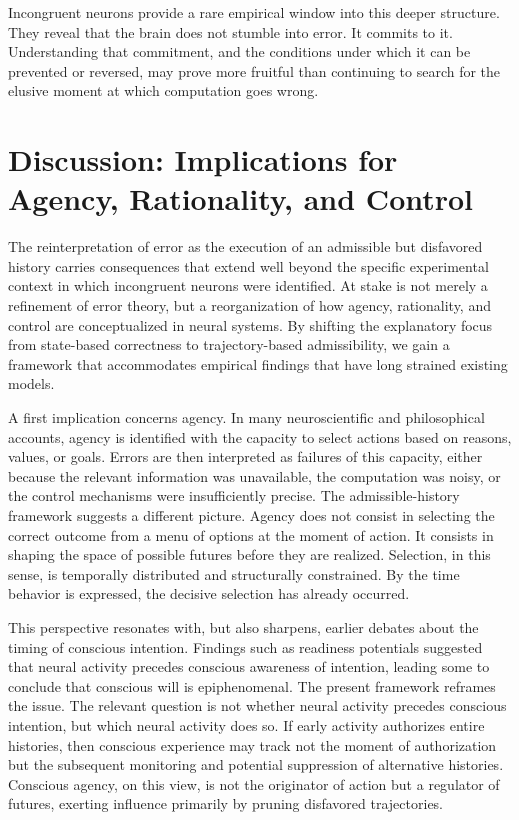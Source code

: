 \documentclass[11pt]{article}
\begin{document}
Incongruent neurons provide a rare empirical window into this deeper structure. They reveal that the brain does not stumble into error. It commits to it. Understanding that commitment, and the conditions under which it can be prevented or reversed, may prove more fruitful than continuing to search for the elusive moment at which computation goes wrong.

\section{Discussion: Implications for Agency, Rationality, and Control}

The reinterpretation of error as the execution of an admissible but disfavored history carries consequences that extend well beyond the specific experimental context in which incongruent neurons were identified. At stake is not merely a refinement of error theory, but a reorganization of how agency, rationality, and control are conceptualized in neural systems. By shifting the explanatory focus from state-based correctness to trajectory-based admissibility, we gain a framework that accommodates empirical findings that have long strained existing models.

A first implication concerns agency. In many neuroscientific and philosophical accounts, agency is identified with the capacity to select actions based on reasons, values, or goals. Errors are then interpreted as failures of this capacity, either because the relevant information was unavailable, the computation was noisy, or the control mechanisms were insufficiently precise. The admissible-history framework suggests a different picture. Agency does not consist in selecting the correct outcome from a menu of options at the moment of action. It consists in shaping the space of possible futures before they are realized. Selection, in this sense, is temporally distributed and structurally constrained. By the time behavior is expressed, the decisive selection has already occurred.

This perspective resonates with, but also sharpens, earlier debates about the timing of conscious intention. Findings such as readiness potentials suggested that neural activity precedes conscious awareness of intention, leading some to conclude that conscious will is epiphenomenal. The present framework reframes the issue. The relevant question is not whether neural activity precedes conscious intention, but which neural activity does so. If early activity authorizes entire histories, then conscious experience may track not the moment of authorization but the subsequent monitoring and potential suppression of alternative histories. Conscious agency, on this view, is not the originator of action but a regulator of futures, exerting influence primarily by pruning disfavored trajectories.
\end{document}
